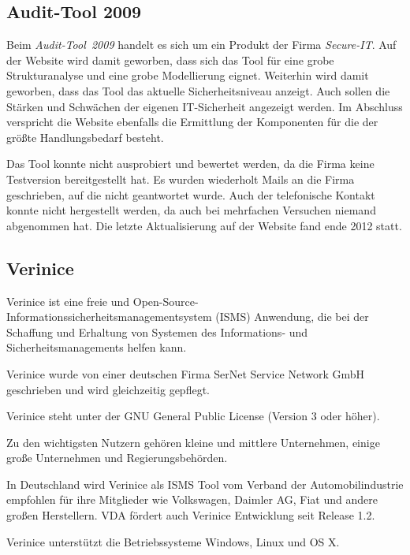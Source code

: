 \subsection{Audit-Tool 2009}
Beim \textit{Audit-Tool~2009} handelt es sich um ein Produkt der Firma \textit{Secure-IT}.
Auf der Website wird damit geworben, dass sich das Tool für eine grobe Strukturanalyse und eine grobe Modellierung eignet.
Weiterhin wird damit geworben, dass das Tool das aktuelle Sicherheitsniveau anzeigt. Auch sollen die Stärken und Schwächen  der
eigenen IT-Sicherheit angezeigt werden.
Im Abschluss verspricht die Website ebenfalls die Ermittlung der Komponenten für die der 
größte Handlungsbedarf besteht.

Das Tool konnte nicht ausprobiert und bewertet werden, da die Firma keine Testversion bereitgestellt hat.
Es wurden wiederholt Mails an die Firma geschrieben, auf die nicht geantwortet wurde.
Auch der telefonische Kontakt konnte nicht hergestellt werden, da auch bei mehrfachen Versuchen niemand abgenommen hat.
Die letzte Aktualisierung auf der Website fand ende 2012 statt.


\subsection{Verinice}
Verinice ist eine freie und Open-Source-Informationssicherheitsmanagementsystem (ISMS) Anwendung, die bei der Schaffung und Erhaltung von Systemen des Informations- und Sicherheitsmanagements helfen kann.

Verinice wurde von einer deutschen Firma SerNet Service Network GmbH geschrieben und wird gleichzeitig gepflegt.

Verinice steht unter der GNU General Public License (Version 3 oder höher).

Zu den wichtigsten Nutzern gehören kleine und mittlere Unternehmen, einige große Unternehmen und Regierungsbehörden.

In Deutschland wird Verinice als ISMS Tool vom Verband der Automobilindustrie empfohlen
für ihre Mitglieder wie Volkswagen, Daimler AG, Fiat und andere großen Herstellern.
VDA fördert auch Verinice Entwicklung seit Release 1.2.

Verinice unterstützt die Betriebssysteme Windows, Linux und OS X.

